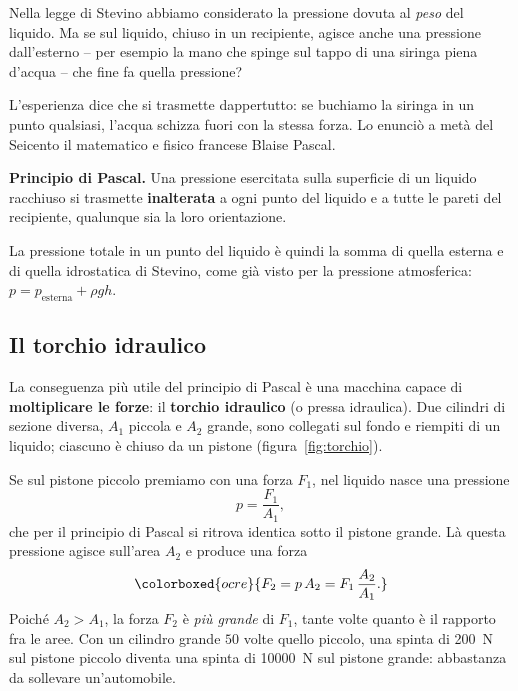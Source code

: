 Nella legge di Stevino abbiamo considerato la pressione dovuta al \emph{peso} del liquido. Ma se sul liquido, chiuso in un recipiente, agisce anche una pressione dall'esterno -- per esempio la mano che spinge sul tappo di una siringa piena d'acqua -- che fine fa quella pressione?

L'esperienza dice che si trasmette dappertutto: se buchiamo la siringa in un punto qualsiasi, l'acqua schizza fuori con la stessa forza. Lo enunciò a metà del Seicento il matematico e fisico francese Blaise Pascal.

\begin{definizione}
\textbf{Principio di Pascal.} Una pressione esercitata sulla superficie di un liquido racchiuso si trasmette \textbf{inalterata} a ogni punto del liquido e a tutte le pareti del recipiente, qualunque sia la loro orientazione.
\end{definizione}

La pressione totale in un punto del liquido è quindi la somma di quella esterna e di quella idrostatica di Stevino, come già visto per la pressione atmosferica: $p = p_\text{esterna} + \rho g h$.

\subsection{Il torchio idraulico}
La conseguenza più utile del principio di Pascal è una macchina capace di \textbf{moltiplicare le forze}: il \textbf{torchio idraulico} (o pressa idraulica). Due cilindri di sezione diversa, $A_1$ piccola e $A_2$ grande, sono collegati sul fondo e riempiti di un liquido; ciascuno è chiuso da un pistone (figura~\ref{fig:torchio}).

Se sul pistone piccolo premiamo con una forza $F_1$, nel liquido nasce una pressione
\[ p = \frac{F_1}{A_1}, \]
che per il principio di Pascal si ritrova identica sotto il pistone grande. Là questa pressione agisce sull'area $A_2$ e produce una forza
\[ \colorboxed{ocre}{ F_2 = p\,A_2 = F_1\,\frac{A_2}{A_1}. } \]
Poiché $A_2 > A_1$, la forza $F_2$ è \emph{più grande} di $F_1$, tante volte quanto è il rapporto fra le aree. Con un cilindro grande $50$ volte quello piccolo, una spinta di \SI{200}{\newton} sul pistone piccolo diventa una spinta di \SI{10000}{\newton} sul pistone grande: abbastanza da sollevare un'automobile.

